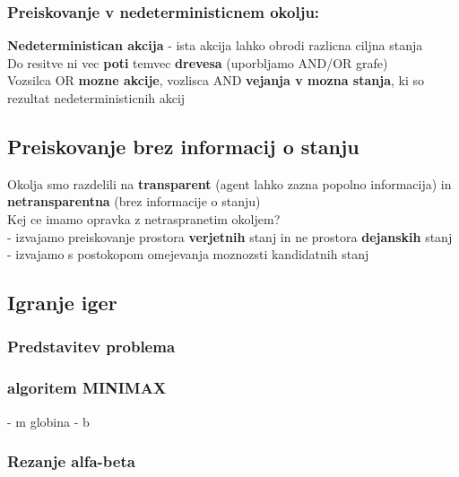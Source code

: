 \subsubsection{Preiskovanje v nedeterministicnem okolju:}
\textbf{Nedeterministican akcija} - ista akcija lahko obrodi razlicna ciljna stanja\\
Do resitve ni vec \textbf{poti} temvec \textbf{drevesa} (uporbljamo AND/OR grafe)\\
Vozsilca OR \textbf{mozne akcije}, vozlisca AND \textbf{vejanja v mozna stanja}, ki so rezultat nedeterministicnih akcij

\subsection{Preiskovanje brez informacij o stanju}
Okolja smo razdelili na \textbf{transparent} (agent lahko zazna popolno informacija) in \textbf{netransparentna} (brez informacije o stanju)\\
Kej ce imamo opravka z netraspranetim okoljem?\\
- izvajamo preiskovanje prostora \textbf{verjetnih} stanj in ne prostora \textbf{dejanskih} stanj\\
- izvajamo s postokopom omejevanja moznozsti kandidatnih stanj\

\subsection{Igranje iger}

\subsubsection{Predstavitev problema}

\subsubsection{algoritem MINIMAX}
- m globina
- b 

\subsubsection{Rezanje alfa-beta}
